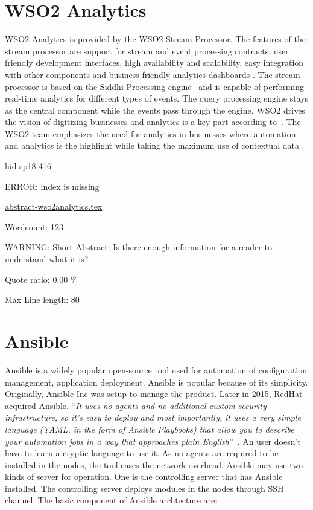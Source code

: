 \section{WSO2 Analytics}

WSO2 Analytics is provided by the WSO2 Stream Processor. The features of the 
stream processor are support for stream and event processing contracts, user 
friendly development interfaces, high availability and scalability, easy 
integration with other components and business friendly analytics dashboards 
\cite{hid-sp18-416-www-wso2-stream-processor}. The stream processor is based on 
the Siddhi Processing engine~\cite{hid-sp18-416-github-siddhi} and is capable 
of  performing real-time analytics for different types of events. The query 
processing engine stays as the central component while the events pass through 
the engine. WSO2 drives the vision of digitizing businesses and analytics is a 
key part according to~\cite{hid-sp18-416-www-srinath-conference-talk}. The WSO2 
team emphasizes the need for analytics in businesses where automation and 
analytics is the highlight while taking the maximum use of contextual data 
\cite{hid-sp18-416-www-business-benefits-analytics}.

\begin{IU}

hid-sp18-416

ERROR: index is missing

\href{https://github.com/cloudmesh-community/hid-sp18-416/blob/master//technology/abstract-wso2analytics.tex}{abstract-wso2analytics.tex}

 

Wordcount: 123

WARNING: Short Abstract: Is there enough information for a reader to understand what it is?


Quote ratio: 0.00 \%
 
Max Line length: 80
\end{IU}

\section{Ansible}

Ansible is a widely popular open-source tool used for automation of
configuration management, application deployment. Ansible is popular
because of its simplicity. Originally, Ansible Inc was setup to manage
the product. Later in 2015, RedHat acquired Ansible.  \color{blue}``\emph{It uses no
agents and no additional custom security infrastructure, so it’s easy
to deploy and most importantly, it uses a very simple language (YAML,
in the form of Ansible Playbooks) that allow you to describe your
automation jobs in a way that approaches plain
English}''\color{black}~\cite{hid-sp18-417-doc-Ansible}.  An user doesn’t have to
learn a cryptic language to use it.  As no agents are required to be
installed in the nodes, the tool eases the network overhead. Ansible
may use two kinds of server for operation. One is the controlling
server that has Ansible installed.  The controlling server deploys
modules in the nodes through SSH channel.  The basic component of
Ansible archtecture are:

